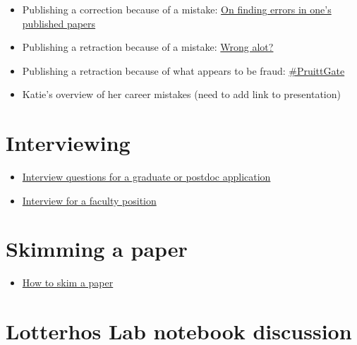\documentclass[
  letterpaper,
  DIV=11,
  numbers=noendperiod]{scrreprt}
\providecommand{\tightlist}{%
  \setlength{\itemsep}{0pt}\setlength{\parskip}{0pt}}\usepackage{longtable,booktabs,array}
\begin{document}
\begin{itemize}
\item
  Publishing a correction because of a mistake:
  \href{https://dynamicecology.wordpress.com/2016/12/02/on-finding-errors-in-ones-published-analyses/}{On
  finding errors in one's published papers}
\item
  Publishing a retraction because of a mistake:
  \href{http://ecoevoevoeco.blogspot.com/2016/12/wrong-lot.html\%20http://ecoevoevoeco.blogspot.com/2016/12/wrong-lot.html}{Wrong
  alot?}
\item
  Publishing a retraction because of what appears to be fraud:
  \href{https://laskowskilab.faculty.ucdavis.edu/2020/01/29/retractions/}{\#PruittGate}
\item
  Katie's overview of her career mistakes (need to add link to
  presentation)
\end{itemize}

\hypertarget{interviewing}{%
\section*{\texorpdfstring{\textbf{Interviewing}}{Interviewing}}\label{interviewing}}

\begin{itemize}
\item
  \href{https://docs.google.com/document/d/1SM3PiIfo4f_Pd_NZxC4Br1g5E0mnqCUlwilrleatNWA/edit}{Interview
  questions for a graduate or postdoc application}
\item
  \href{https://docs.google.com/document/d/1OvvB6yl_5l05dUn3frL5GEJeksc5xjy8a_keq8sp0fc/edit}{Interview
  for a faculty position}
\end{itemize}

\hypertarget{skimming-a-paper}{%
\section*{\texorpdfstring{\textbf{Skimming a
paper}}{Skimming a paper}}\label{skimming-a-paper}}

\begin{itemize}
\tightlist
\item
  \href{https://docs.google.com/document/d/17wIUVwRGpfRMG-riBjCj9EyCnPMb-K8RX7ww5C0kzf8/edit}{How
  to skim a paper}
\end{itemize}

\hypertarget{lotterhos-lab-notebook-discussion}{%
\section*{\texorpdfstring{\textbf{Lotterhos Lab notebook
discussion}}{Lotterhos Lab notebook discussion}}\label{lotterhos-lab-notebook-discussion}}
\end{document}
